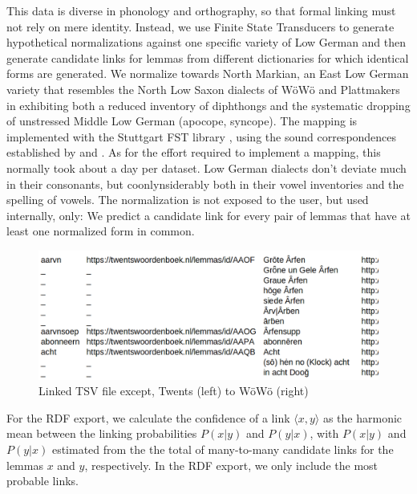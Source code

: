 This data is diverse in phonology and orthography, so that formal linking must not rely on mere identity. Instead, we use Finite State Transducers to generate hypothetical normalizations against one specific variety of Low German and then generate candidate links for lemmas from different dictionaries for which identical forms are generated. We normalize towards North Markian, an East Low German variety that resembles the North Low Saxon dialects of WöWö and Plattmakers in exhibiting both a reduced inventory of diphthongs and the systematic dropping of unstressed Middle Low German  (apocope, syncope). The mapping is implemented with the Stuttgart FST library \cite{schmid2006programming}, using the sound correspondences established by \cite{pfaff1898vocale,teuchert1907mundart} and \cite{mackel1905mundart}. As for the effort required to implement a mapping, this normally took about a day per dataset. Low German dialects don't deviate much in their consonants, but coonlynsiderably both in their vowel inventories and the spelling of vowels. The normalization is not exposed to the user, but used internally, only: We predict a candidate link for every pair of lemmas that have at least one normalized form in common.

\begin{figure}
    \centering
    \includegraphics[width=1.0\linewidth]{img/tsv-linked.png}
    \caption{Linked TSV file except, Twents (left) to WöWö (right)}
    \label{fig-twents-woewoe}
\end{figure}

For the RDF export, we calculate the confidence of a link $\langle x,y\rangle$ as the harmonic mean between the linking probabilities $P(x|y)$ and $P(y|x)$, with $P(x|y)$ and $P(y|x)$  estimated from the the total of many-to-many candidate links for the lemmas $x$ and $y$, respectively. In the RDF export, we only include the most probable links. 


